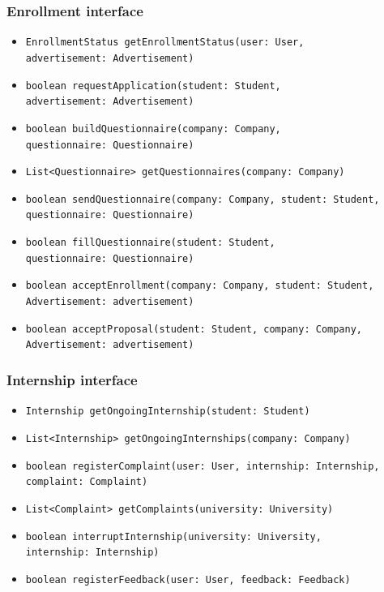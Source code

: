 \subsubsection{Enrollment interface}
\begin{itemize}
    \item \verb|EnrollmentStatus getEnrollmentStatus(user: User, | \\ \makebox[10em][l]{} \verb|advertisement: Advertisement)|
    \item \verb|boolean requestApplication(student: Student, | \\ \makebox[10em][l]{} \verb|advertisement: Advertisement)|
    \item \verb|boolean buildQuestionnaire(company: Company, | \\ \makebox[10em][l]{} \verb|questionnaire: Questionnaire)|
    \item \verb|List<Questionnaire> getQuestionnaires(company: Company)|
    \item \verb|boolean sendQuestionnaire(company: Company, student: Student, | \\ \makebox[10em][l]{} \verb|questionnaire: Questionnaire)|
    \item \verb|boolean fillQuestionnaire(student: Student, | \\ \makebox[10em][l]{} \verb|questionnaire: Questionnaire)|
    \item \verb|boolean acceptEnrollment(company: Company, student: Student, | \\ \makebox[10em][l]{} \verb|Advertisement: advertisement)|
    \item \verb|boolean acceptProposal(student: Student, company: Company, | \\ \makebox[10em][l]{} \verb|Advertisement: advertisement)|
\end{itemize}

\subsubsection{Internship interface}
\begin{itemize}
    \item \verb|Internship getOngoingInternship(student: Student)|
    \item \verb|List<Internship> getOngoingInternships(company: Company)|
    \item \verb|boolean registerComplaint(user: User, internship: Internship, | \\ \makebox[10em][l]{} \verb|complaint: Complaint)|
    \item \verb|List<Complaint> getComplaints(university: University)|
    \item \verb|boolean interruptInternship(university: University, | \\ \makebox[10em][l]{} \verb|internship: Internship)|
    \item \verb|boolean registerFeedback(user: User, feedback: Feedback)|
\end{itemize}


